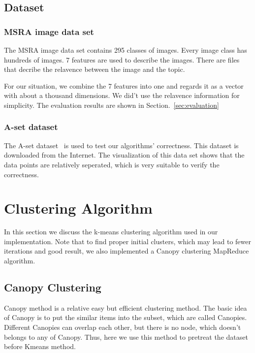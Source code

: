 \documentclass[a4paper,11pt]{article}
\begin{document}
\subsection{Dataset}
\subsubsection{MSRA image data set}
The MSRA image data set contains 295 classes of images. Every image class
has hundreds of images. 7 features are used to describe the images. There are
files that decribe the relavence between the image and the topic.

For our situation, we combine the 7 features into one and regards it as a vector
with about a thousand dimensions. We did't use the relavence information for
simplicity. The evaluation results are shown in Section.~\ref{sec:evaluation}
\subsubsection{A-set dataset}
The A-set dataset~\cite{dataset:aset} is used to test our algorithms'
correctness. This dataset is downloaded from the Internet. The visualization of
this data set shows that the data points are relatively seperated, which is very
suitable to verify the correctness.

\section{Clustering Algorithm}
In this section we discuss the k-means clustering algorithm used in our
implementation. Note that to find proper initial clusters, which may lead to
fewer iterations and good result, we also implemented a Canopy clustering
MapReduce algorithm.
\subsection{Canopy Clustering}
Canopy method is a relative easy but efficient clustering method. The basic
idea of Canopy is to put the similar items into the subset, which are called
Canopies. Different Canopies can overlap each other, but there is no node,
which doesn't belongs to any of Canopy. Thus, here we use this method to
pretreat the dataset before Kmeans method.
\end{document}
